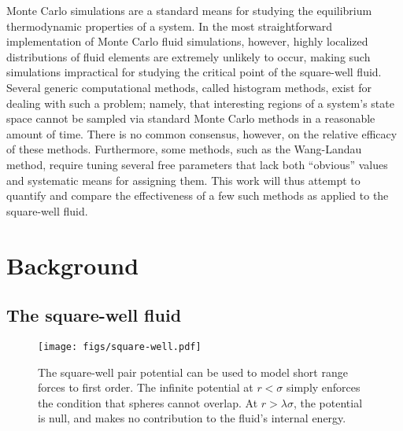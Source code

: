 \documentclass[11pt]{article}
\begin{document}
Monte Carlo simulations are a standard means for studying the
equilibrium thermodynamic properties of a system. In the most
straightforward implementation of Monte Carlo fluid simulations,
however, highly localized distributions of fluid elements are
extremely unlikely to occur, making such simulations impractical for
studying the critical point of the square-well fluid. Several generic
computational methods, called histogram methods, exist for dealing
with such a problem; namely, that interesting regions of a system's
state space cannot be sampled via standard Monte Carlo methods in a
reasonable amount of time. There is no common consensus, however, on
the relative efficacy of these methods. Furthermore, some methods,
such as the Wang-Landau method\cite{wang_landau}, require tuning
several free parameters that lack both ``obvious'' values and
systematic means for assigning them. This work will thus attempt to
quantify and compare the effectiveness of a few such methods as
applied to the square-well fluid.


\section{Background}
\label{sec:background}

\subsection{The square-well fluid}
\label{sec:sw_fluid}

\begin{figure}[tb]
  \centering
  \texttt{[image: figs/square-well.pdf]}
  \caption[The square-well pair potential]{The square-well pair
    potential can be used to model short range forces to first
    order. The infinite potential at $r<\sigma$ simply enforces the
    condition that spheres cannot overlap. At $r>\lambda\sigma$, the
    potential is null, and makes no contribution to the fluid's
    internal energy.}
  \label{fig:pair_potential}
\end{figure}
\end{document}
